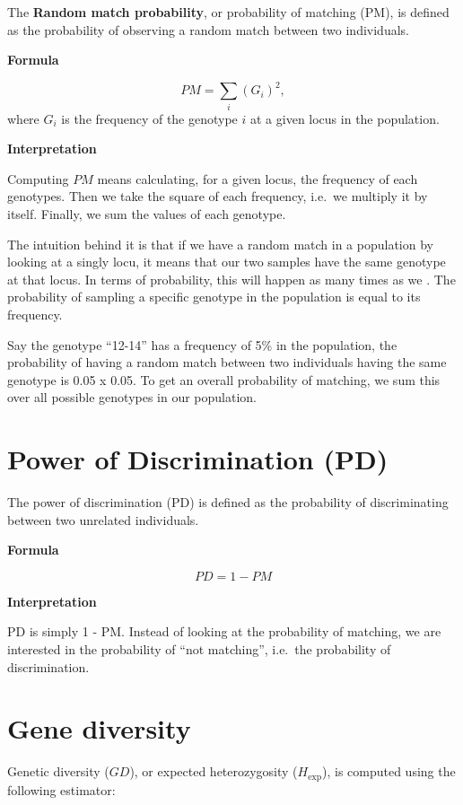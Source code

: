 \documentclass[
]{book}
\begin{document}
The \textbf{Random match probability}, or probability of matching (PM), is defined as
the probability of observing a random match between two individuals.

\textbf{Formula}

\[
PM = \sum_i (G_i)^2,
\]
where \(G_i\) is the frequency of the genotype \(i\) at a given locus in the population.

\textbf{Interpretation}

Computing \(PM\) means calculating, for a given locus, the frequency of each
genotypes. Then we take the square of each frequency, i.e.~we multiply it by itself.
Finally, we sum the values of each genotype.

The intuition behind it is that if we have a random match in a population by looking
at a singly locu, it means that our two samples have the same genotype at that locus.
In terms of probability, this will happen as many times as we .
The probability of sampling a specific genotype in the population is equal to its frequency.

Say the genotype ``12-14'' has a frequency of 5\% in the population, the probability of
having a random match between two individuals having the same genotype is 0.05 x 0.05.
To get an overall probability of matching, we sum this over all possible genotypes
in our population.

\hypertarget{power-of-discrimination-pd}{%
\section{Power of Discrimination (PD)}\label{power-of-discrimination-pd}}

The power of discrimination (PD) is defined as the probability of
discriminating between two unrelated individuals.

\textbf{Formula}

\[
PD = 1 - PM
\]

\textbf{Interpretation}

PD is simply 1 - PM. Instead of looking at the probability of matching, we are
interested in the probability of ``not matching'', i.e.~the probability of discrimination.

\hypertarget{gene-diversity}{%
\section{Gene diversity}\label{gene-diversity}}

Genetic diversity (\(GD\)), or expected heterozygosity (\(H_{\mathrm{exp}}\)), is
computed using the following estimator:
\end{document}

